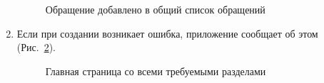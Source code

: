 \documentclass{../includes/TechDoc}
\begin{document}
\begin{enumerate}
\begin{figure}[h]
\begin{center}
\begin{minipage}[h]{0.35\linewidth}
                    \caption{Обращение добавлено в общий список обращений}
                    \label{ris:problem_list}
                \end{minipage}
            \end{center}
        \end{figure}

        \item Если при создании возникает ошибка, приложение сообщает об этом (Рис.~\ref{ris:create_new_problem_error}).
        \begin{figure}[h]
            \centering
            \caption{Главная страница со всеми требуемыми разделами}
            \label{ris:create_new_problem_error}
        \end{figure}


\end{enumerate}
\end{document}
